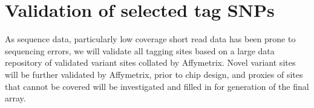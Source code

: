 \section{Validation of selected tag SNPs}

As sequence data, particularly low coverage short read data has been prone to sequencing errors, we will validate all tagging sites based on a large data repository of validated variant sites collated by Affymetrix. Novel variant sites will be further validated by Affymetrix, prior to chip design, and proxies of sites that cannot be covered will be investigated and filled in for generation of the final array.